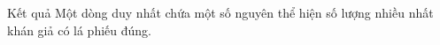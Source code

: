 Kết quả
Một dòng duy nhất chứa một số nguyên thể hiện số lượng nhiều nhất khán giả có lá phiếu đúng.